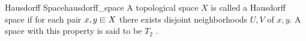 \begin{definition}{Hausdorff Space}{hausdorff_space}
A topological space \( X \) is called a Hausdorff space if for each pair \( x, y
\din X\) there exists disjoint neighborhoods \( U, V \) of \( x, y \). A space
with this property is said to be \( T _{ 2 }  \) .
\end{definition}
